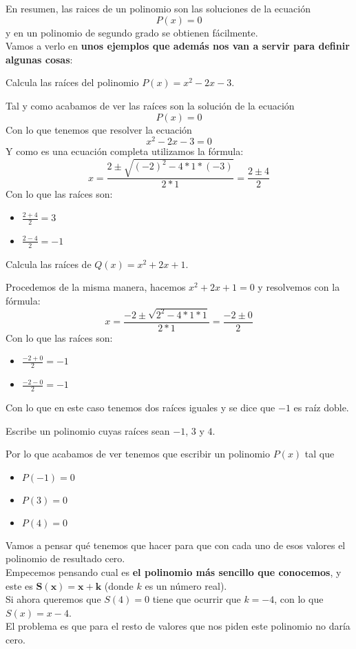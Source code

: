 \documentclass[a4paper,11pt,answers]{exam}
\begin{document}
En resumen, las raices de un polinomio son las soluciones de la ecuación
\[P(x) = 0\]
y en un polinomio de segundo grado se obtienen fácilmente.\\
Vamos a verlo en \textbf{unos ejemplos que además nos van a servir para definir algunas cosas}:
\begin{questions}
\question Calcula las raíces del polinomio $P(x) = x^2 -2x -3$.
  \begin{solution}
    Tal y como acabamos de ver las raíces son la solución de la ecuación
    \[P(x) = 0\]
    Con lo que tenemos que resolver la ecuación
    \[x^2 - 2x - 3 = 0\]
    Y como es una ecuación completa utilizamos la fórmula:
    \[x = \frac{2 \pm \sqrt{(-2)^2 - 4*1*(-3)}}{2*1} = \frac{2\pm 4}{2}\]
    Con lo que las raíces son:
    \begin{itemize}
    \item $\frac{2+4}{2} = 3$
    \item $\frac{2-4}{2} = -1$
    \end{itemize}
  \end{solution}
\question Calcula las raíces de $Q(x) = x^2 + 2x + 1$.
  \begin{solution}
    Procedemos de la misma manera, hacemos $x^2 + 2x + 1 = 0$ y resolvemos con la fórmula:
    \[x = \frac{-2 \pm \sqrt{2^2 - 4*1*1}}{2*1} = \frac{-2\pm 0}{2}\]
    Con lo que las raíces son:
    \begin{itemize}
    \item $\frac{-2+0}{2} = -1$
    \item $\frac{-2-0}{2} = -1$
    \end{itemize}
    Con lo que en este caso tenemos dos raíces iguales y se dice que $-1$ es raíz doble.
  \end{solution}
\question Escribe un polinomio cuyas raíces sean $-1$, $3$ y $4$.
  \begin{solution}
    Por lo que acabamos de ver tenemos que escribir un polinomio $P(x)$ tal que
    \begin{itemize}
    \item $P(-1) = 0$
    \item $P(3)= 0$
    \item $P(4) = 0$
    \end{itemize}
    Vamos a pensar qué tenemos que hacer para que con cada uno de esos valores el polinomio de
    resultado cero.\\
    Empecemos pensando cual es \textbf{el polinomio más sencillo que conocemos}, y este es
    $\boldsymbol{S(x) = x + k}$ (donde $k$ es un número real).\\
    Si ahora queremos que $S(4) = 0$ tiene que ocurrir que $k = -4$, con lo que $S(x) = x - 4$.\\
    El problema es que para el resto de valores que nos piden este polinomio no daría cero.\\
    

\end{solution}
\end{questions}
\end{document}
